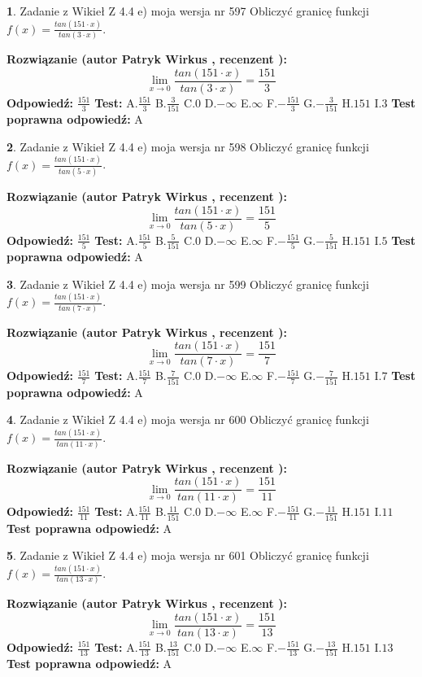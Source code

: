 \documentclass[12pt, a4paper]{article}
\theoremstyle{definition} %
\newtheorem{zad}{}
\newcommand{\zadStart}[1]{\begin{zad}#1\newline}
\newcommand{\zadStop}{\end{zad}}
\newcommand{\rozwStart}[2]{\noindent \textbf{Rozwiązanie (autor #1 , recenzent #2): }\newline}
\newcommand{\rozwStop}{\newline}
\newcommand{\odpStart}{\noindent \textbf{Odpowiedź:}\newline}
\newcommand{\odpStop}{\newline}
\newcommand{\testStart}{\noindent \textbf{Test:}\newline}
\newcommand{\testStop}{\newline}
\newcommand{\kluczStart}{\noindent \textbf{Test poprawna odpowiedź:}\newline}
\newcommand{\kluczStop}{\newline}
\begin{document}
\zadStart{Zadanie z Wikieł Z 4.4 e) moja wersja nr 597}
Obliczyć granicę funkcji $f(x)=\frac{tan(151\cdot x)}{tan(3\cdot x)}$.
\zadStop
\rozwStart{Patryk Wirkus}{}
$$\lim\limits_{x\to 0}\frac{tan(151\cdot x)}{tan(3\cdot x)}=
\frac{151}{3}$$
\rozwStop
\odpStart
$\frac{151}{3}$
\odpStop
\testStart
A.$\frac{151}{3}$
B.$\frac{3}{151}$
C.$0$
D.$-\infty$
E.$\infty$
F.$-\frac{151}{3}$
G.$-\frac{3}{151}$
H.$151$
I.$3$
\testStop
\kluczStart
A
\kluczStop



\zadStart{Zadanie z Wikieł Z 4.4 e) moja wersja nr 598}
Obliczyć granicę funkcji $f(x)=\frac{tan(151\cdot x)}{tan(5\cdot x)}$.
\zadStop
\rozwStart{Patryk Wirkus}{}
$$\lim\limits_{x\to 0}\frac{tan(151\cdot x)}{tan(5\cdot x)}=
\frac{151}{5}$$
\rozwStop
\odpStart
$\frac{151}{5}$
\odpStop
\testStart
A.$\frac{151}{5}$
B.$\frac{5}{151}$
C.$0$
D.$-\infty$
E.$\infty$
F.$-\frac{151}{5}$
G.$-\frac{5}{151}$
H.$151$
I.$5$
\testStop
\kluczStart
A
\kluczStop



\zadStart{Zadanie z Wikieł Z 4.4 e) moja wersja nr 599}
Obliczyć granicę funkcji $f(x)=\frac{tan(151\cdot x)}{tan(7\cdot x)}$.
\zadStop
\rozwStart{Patryk Wirkus}{}
$$\lim\limits_{x\to 0}\frac{tan(151\cdot x)}{tan(7\cdot x)}=
\frac{151}{7}$$
\rozwStop
\odpStart
$\frac{151}{7}$
\odpStop
\testStart
A.$\frac{151}{7}$
B.$\frac{7}{151}$
C.$0$
D.$-\infty$
E.$\infty$
F.$-\frac{151}{7}$
G.$-\frac{7}{151}$
H.$151$
I.$7$
\testStop
\kluczStart
A
\kluczStop



\zadStart{Zadanie z Wikieł Z 4.4 e) moja wersja nr 600}
Obliczyć granicę funkcji $f(x)=\frac{tan(151\cdot x)}{tan(11\cdot x)}$.
\zadStop
\rozwStart{Patryk Wirkus}{}
$$\lim\limits_{x\to 0}\frac{tan(151\cdot x)}{tan(11\cdot x)}=
\frac{151}{11}$$
\rozwStop
\odpStart
$\frac{151}{11}$
\odpStop
\testStart
A.$\frac{151}{11}$
B.$\frac{11}{151}$
C.$0$
D.$-\infty$
E.$\infty$
F.$-\frac{151}{11}$
G.$-\frac{11}{151}$
H.$151$
I.$11$
\testStop
\kluczStart
A
\kluczStop



\zadStart{Zadanie z Wikieł Z 4.4 e) moja wersja nr 601}
Obliczyć granicę funkcji $f(x)=\frac{tan(151\cdot x)}{tan(13\cdot x)}$.
\zadStop
\rozwStart{Patryk Wirkus}{}
$$\lim\limits_{x\to 0}\frac{tan(151\cdot x)}{tan(13\cdot x)}=
\frac{151}{13}$$
\rozwStop
\odpStart
$\frac{151}{13}$
\odpStop
\testStart
A.$\frac{151}{13}$
B.$\frac{13}{151}$
C.$0$
D.$-\infty$
E.$\infty$
F.$-\frac{151}{13}$
G.$-\frac{13}{151}$
H.$151$
I.$13$
\testStop
\kluczStart
A
\kluczStop
\end{document}
